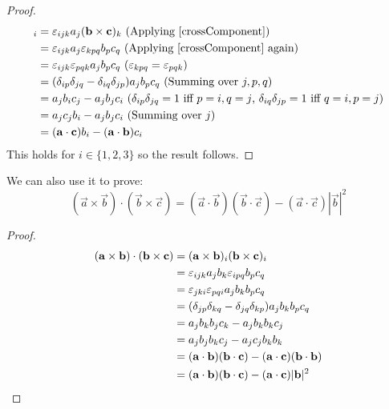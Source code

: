 \documentclass[../main.tex]{subfiles}
\begin{document}
\begin{proof}
  \begin{align*}
    [\vec{a} \times (\vec{b} \times \vec{c})]_i &= \levi_{ijk} a_j (\vec{b} \times \vec{c})_k \text{ (Applying \cref{crossComponent})} \\
                                                &= \levi_{ijk} a_j \levi_{kpq} b_p c_q \text{ (Applying \cref{crossComponent} again)}\\
                                                &= \levi_{ijk} \levi_{pqk} a_j b_p c_q \text{ ($\levi_{k p q} = \levi_{p q k}$)}\\
                                                &= (\delta_{i p} \delta_{j q} - \delta_{i q} \delta_{j p}) a_j b_p c_q \text{ (Summing over $j, p, q$)} \\
                                                &= a_j b_i c_j - a_j b_j c_i \text{ ($\delta_{i p} \delta_{j q} = 1$ iff $p = i, q = j$, $\delta_{i q}\delta_{j p} = 1$ iff $q = i, p = j$)}\\
                                                &= a_j c_j b_i - a_j b_j c_i \text{ (Summing over $j$)}\\
                                                &= (\vec{a} \cdot \vec{c})b_i - (\vec{a} \cdot \vec{b})c_i
  \end{align*}
  This holds for $i \in \{1, 2, 3\}$ so the result follows.
\end{proof}
We can also use it to prove:
\[
  (\vec{a} \times \vec{b}) \cdot (\vec{b} \times \vec{c}) = (\vec{a} \cdot \vec{b})(\vec{b} \cdot \vec{c}) - (\vec{a} \cdot \vec{c})|\vec{b}|^2
\]
\begin{proof}
  \begin{align*}
    (\boldsymbol{\mathbf{a}} \times \boldsymbol{\mathbf{b}}) \cdot (\boldsymbol{\mathbf{b}} \times \boldsymbol{\mathbf{c}}) &= (\boldsymbol{\mathbf{a}} \times \boldsymbol{\mathbf{b}})_i (\boldsymbol{\mathbf{b}} \times \boldsymbol{\mathbf{c}})_i \\
     &= \varepsilon_{i j k} a_j b_k \varepsilon_{i p q} b_p c_q \\
     &= \varepsilon_{j k i} \varepsilon_{p q i} a_j b_k b_p c_q \\
     &= (\delta_{j p}\delta_{k q} - \delta_{j q}\delta_{k p}) a_j b_k b_p c_q \\
     &= a_j b_k b_j c_k - a_j b_k b_k c_j \\
     &= a_j b_j b_k c_j - a_j c_j b_k b_k \\
     &= (\boldsymbol{\mathbf{a}} \cdot \boldsymbol{\mathbf{b}}) (\boldsymbol{\mathbf{b}} \cdot \boldsymbol{\mathbf{c}}) - (\boldsymbol{\mathbf{a}} \cdot \boldsymbol{\mathbf{c}}) (\boldsymbol{\mathbf{b}} \cdot \boldsymbol{\mathbf{b}}) \\
     &= (\boldsymbol{\mathbf{a}} \cdot \boldsymbol{\mathbf{b}}) (\boldsymbol{\mathbf{b}} \cdot \boldsymbol{\mathbf{c}}) - (\boldsymbol{\mathbf{a}} \cdot \boldsymbol{\mathbf{c}}) |\boldsymbol{\mathbf{b}}|^2
  \end{align*}
\end{proof}
\end{document}

